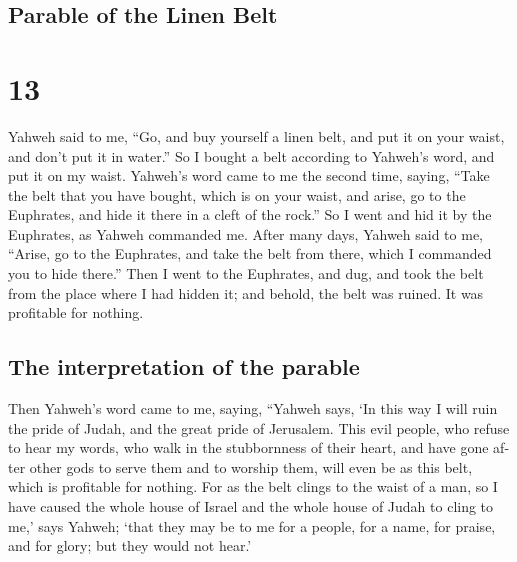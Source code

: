 \begin{paracol}{2}
\switchcolumn
\begin{otherlanguage}{english}

\hypertarget{parable-of-the-linen-belt}{%
\subsection{Parable of the Linen Belt}\label{parable-of-the-linen-belt}}

\hypertarget{section-25}{%
\section{13}\label{section-25}}

 Yahweh said to me, ``Go, and buy yourself a linen belt,
and put it on your waist, and don't put it in water.''  So
I bought a belt according to Yahweh's word, and put it on my waist.
 Yahweh's word came to me the second time, saying,
 ``Take the belt that you have bought, which is on your
waist, and arise, go to the Euphrates, and hide it there in a cleft of
the rock.''  So I went and hid it by the Euphrates, as
Yahweh commanded me.  After many days, Yahweh said to me,
``Arise, go to the Euphrates, and take the belt from there, which I
commanded you to hide there.''  Then I went to the
Euphrates, and dug, and took the belt from the place where I had hidden
it; and behold, the belt was ruined. It was profitable for nothing.

\hypertarget{the-interpretation-of-the-parable}{%
\subsection{The interpretation of the
parable}\label{the-interpretation-of-the-parable}}

 Then Yahweh's word came to me, saying, 
``Yahweh says, `In this way I will ruin the pride of Judah, and the
great pride of Jerusalem.  This evil people, who refuse
to hear my words, who walk in the stubbornness of their heart, and have
gone after other gods to serve them and to worship them, will even be as
this belt, which is profitable for nothing.  For as the
belt clings to the waist of a man, so I have caused the whole house of
Israel and the whole house of Judah to cling to me,' says Yahweh; `that
they may be to me for a people, for a name, for praise, and for glory;
but they would not hear.'


\end{otherlanguage}
\end{paracol}
